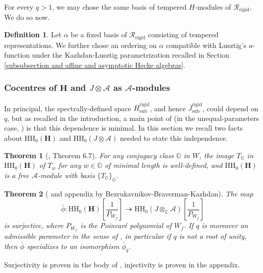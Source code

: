 \documentclass[10pt]{article}
\def\onto{\mathrel{\twoheadrightarrow}}
\newcommand{\HH}{\mathbf{H}}
\newcommand{\C}{\mathbb{C}}
\newtheorem{theorem}{Theorem}
\theoremstyle{definition}
\newtheorem{dfn}{Definition}
\theoremstyle{remark}
\newtheorem{rem}{Remark}
\newcommand{\Hrs}{\overline{H}^{\mathrm{rigid}}_{\mathrm{sub}}}
\newcommand{\Jrs}{\overline{J}^{\mathrm{rigid}}_{\mathrm{sub}}}
\newcommand{\RHr}{\mathcal{R}_{\mathrm{rigid}}}
\newcommand{\hhh}{\mathrm{HH}_0}
\newcommand{\oO}{\mathbb{O}}
\begin{document}
For every $q>1$, we may chose the same basis of tempered $H$-modules
of $\RHr$. We do so now.
%
\begin{dfn}
\label{dfn alpha ordered basis}
Let $\alpha$ be a fixed basis of $\mathcal{R}_{\mathrm{rigid}}$ consisting of 
tempered representations. We further chose an ordering on $\alpha$ compatible with Lusztig's
$a$-function under the Kazhdan-Lusztig parametrization recalled in Section \ref{subsubsection and affine and asymptotic Hecke algebras}.
\end{dfn}
%
%
\subsubsection{Cocentres of $\HH$ and $J\otimes\mathcal{A}$ as $\mathcal{A}$-modules}
\label{subsubsection cocentres of HH and J}
In principal, the spectrally-defined space $\Hrs$, and hence $\Jrs$, could depend on $q$, but as recalled in the introduction, a main point of \cite{HN} (in the unequal-parameters case, \cite{CH}) is that this dependence is minimal.
In this section we recall two facts about
$\hhh(\HH)$ and $\hhh(J\otimes\mathcal{A})$ needed to state this independence.
%
\begin{theorem}[\cite{HN}, Theorem 6.7]
\label{thm CH cocentre is free}
For any conjugacy class $\oO$ in $W$, the image $T_{\oO}$ in $\hhh(\HH)$ of $T_w$ for any $w\in \oO$ of minimal length is well-defined, and
$\hhh(\HH)$ is a free $\mathcal{A}$-module with basis 
$\{T_{\oO}\}_{\oO}$.
\end{theorem}
%
\begin{theorem}[\cite{BDD} and appendix by Bezrukavnikov-Braverman-Kazhdan]
\label{thm BDD cocentre isomorphism}
The map
%
\begin{equation}
\label{eq BDD cocentre isomorphism}
\bar{\phi}\colon \hhh(\HH)\left[\frac{1}{P_{W_f}}\right]\onto \hhh(J\otimes_\C\mathcal{A})\left[\frac{1}{P_{W_f}}\right]
\end{equation}
%
is surjective, where $P_{W_f}$ is the Poincar\'{e} polynomial of $W_f$. If $q$ is moreover an admissible 
parameter in the sense of \cite[Def. 6.6]{CH}, in particular if $q$ is not a root of unity, then 
$\bar{\phi}$ specializes to an isomorphism $\bar{\phi}_q$. 
\end{theorem}
%
Surjectivity is proven in the body of \cite{BDD}, injectivity is proven in the appendix. 
\end{document}
